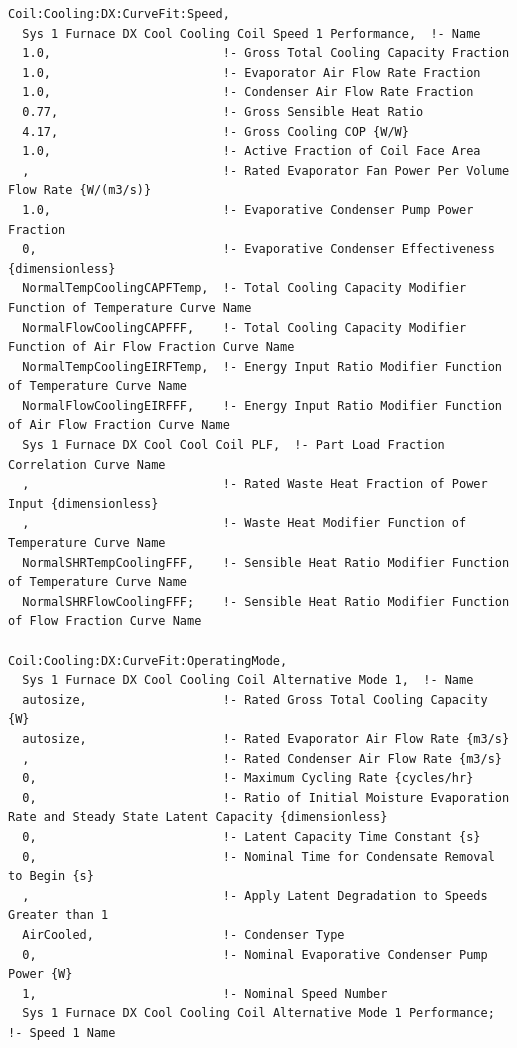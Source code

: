 \begin{lstlisting}
Coil:Cooling:DX:CurveFit:Speed,
  Sys 1 Furnace DX Cool Cooling Coil Speed 1 Performance,  !- Name
  1.0,                        !- Gross Total Cooling Capacity Fraction
  1.0,                        !- Evaporator Air Flow Rate Fraction
  1.0,                        !- Condenser Air Flow Rate Fraction
  0.77,                       !- Gross Sensible Heat Ratio
  4.17,                       !- Gross Cooling COP {W/W}
  1.0,                        !- Active Fraction of Coil Face Area
  ,                           !- Rated Evaporator Fan Power Per Volume Flow Rate {W/(m3/s)}
  1.0,                        !- Evaporative Condenser Pump Power Fraction
  0,                          !- Evaporative Condenser Effectiveness {dimensionless}
  NormalTempCoolingCAPFTemp,  !- Total Cooling Capacity Modifier Function of Temperature Curve Name
  NormalFlowCoolingCAPFFF,    !- Total Cooling Capacity Modifier Function of Air Flow Fraction Curve Name
  NormalTempCoolingEIRFTemp,  !- Energy Input Ratio Modifier Function of Temperature Curve Name
  NormalFlowCoolingEIRFFF,    !- Energy Input Ratio Modifier Function of Air Flow Fraction Curve Name
  Sys 1 Furnace DX Cool Cool Coil PLF,  !- Part Load Fraction Correlation Curve Name
  ,                           !- Rated Waste Heat Fraction of Power Input {dimensionless}
  ,                           !- Waste Heat Modifier Function of Temperature Curve Name
  NormalSHRTempCoolingFFF,    !- Sensible Heat Ratio Modifier Function of Temperature Curve Name
  NormalSHRFlowCoolingFFF;    !- Sensible Heat Ratio Modifier Function of Flow Fraction Curve Name

Coil:Cooling:DX:CurveFit:OperatingMode,
  Sys 1 Furnace DX Cool Cooling Coil Alternative Mode 1,  !- Name
  autosize,                   !- Rated Gross Total Cooling Capacity {W}
  autosize,                   !- Rated Evaporator Air Flow Rate {m3/s}
  ,                           !- Rated Condenser Air Flow Rate {m3/s}
  0,                          !- Maximum Cycling Rate {cycles/hr}
  0,                          !- Ratio of Initial Moisture Evaporation Rate and Steady State Latent Capacity {dimensionless}
  0,                          !- Latent Capacity Time Constant {s}
  0,                          !- Nominal Time for Condensate Removal to Begin {s}
  ,                           !- Apply Latent Degradation to Speeds Greater than 1
  AirCooled,                  !- Condenser Type
  0,                          !- Nominal Evaporative Condenser Pump Power {W}
  1,                          !- Nominal Speed Number
  Sys 1 Furnace DX Cool Cooling Coil Alternative Mode 1 Performance;  !- Speed 1 Name


\end{lstlisting}
